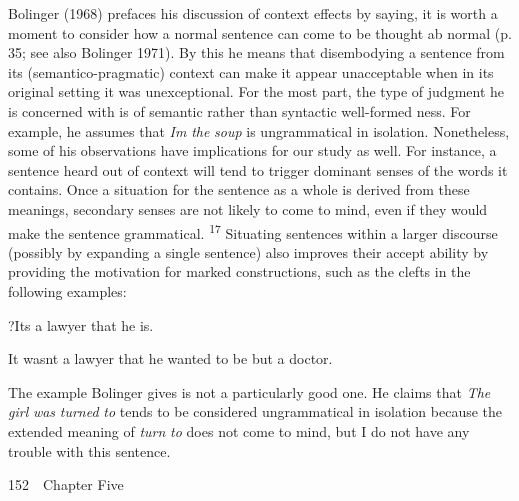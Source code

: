 \begin{styleTextbody}
Bolinger (1968) prefaces his discussion of context effects by saying, {\textquotedbl}it is worth a moment to consider how a normal sentence can come to be thought ab\- normal{\textquotedbl} (p. 35; see also Bolinger 1971). By this he means that disembodying a sentence from its (semantico-pragmatic) context can make it appear unacceptable when in its original setting it was unexceptional. For the most part, the type of judgment he is concerned with is of semantic rather than syntactic well-formed\- ness. For example, he assumes that \textit{I{\textquotesingle}m}\textit{ }\textit{the}\textit{ }\textit{soup}\textit{ }is ungrammatical in isolation. Nonetheless, some of his observations have implications for our study as well. For instance, a sentence heard out of context will tend to trigger dominant senses of the words it contains. Once a situation for the sentence as a whole is derived from these meanings, secondary senses are not likely to come to mind, even if they would make the sentence grammatical. \textsuperscript{17}\textsuperscript{ }Situating sentences within a larger discourse (possibly by expanding a single sentence) also improves their accept\- ability by providing the motivation for marked constructions, such as the clefts in the following examples:
\end{styleTextbody}


\setcounter{listWWNumxxxleveli}{1}
\begin{listWWNumxxxleveli}
\item 
\begin{styleTextbody}
?It{\textquotesingle}s a lawyer that he is.
\end{styleTextbody}


\item 
\begin{styleTextbody}
It wasn{\textquotesingle}t a lawyer that he wanted to be but a doctor.
\end{styleTextbody}


\end{listWWNumxxxleveli}
\setcounter{listWWNumxxxiileveli}{5}
\begin{listWWNumxxxiileveli}
\item 
\begin{styleStandard}
The example Bolinger gives is not a particularly good one. He claims that \textit{The}\textit{ }\textit{girl}\textit{ }\textit{was}\textit{ }\textit{turned}\textit{ }\textit{to}\textit{ }tends to be considered ungrammatical in isolation because the extended meaning of \textit{turn}\textit{ }\textit{to}\textit{ }does not come to mind, but I do not have any trouble with this sentence.
\end{styleStandard}


\end{listWWNumxxxiileveli}
\clearpage\setcounter{page}{1}\begin{styleStandard}
152\ \ Chapter Five
\end{styleStandard}


